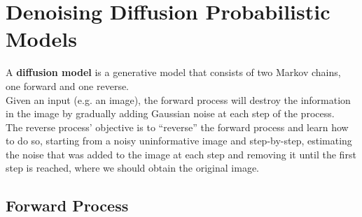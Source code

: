 \documentclass[twoside]{article}
\numberwithin{equation}{section}
\numberwithin{figure}{section}
\begin{document}
\newpage
\section{Denoising Diffusion Probabilistic Models}

A \textbf{diffusion model} is a generative model that consists of two Markov chains, one forward and one reverse. \\
Given an input (e.g. an image), the forward process will destroy the information in the image by gradually adding Gaussian noise at each step of the process. \cite{ho2020denoising} \\
The reverse process' objective is to ``reverse'' the forward process and learn how to do so, starting from a noisy uninformative image and step-by-step, estimating the noise that was added to the image at each step and removing it until the first step is reached, where we should obtain the original image. \cite{ho2020denoising} \\

\subsection{Forward Process}
\end{document}
